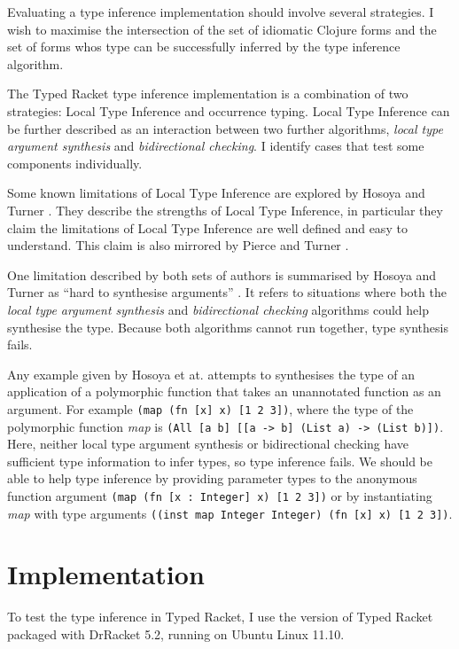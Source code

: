 \documentclass[12pt,a4paper]{article}
\begin{document}
Evaluating a type inference implementation should involve several
strategies. I wish to maximise the intersection of 
the set of idiomatic Clojure forms and the set of forms whos type
can be successfully inferred by the type inference algorithm.

The Typed Racket type inference implementation is a combination
of two strategies: Local Type Inference and occurrence typing. 
Local Type Inference can be further described as an interaction between
two further algorithms,
\emph{local type argument synthesis} and \emph{bidirectional checking}\cite{Hosoya99howgood}.
I identify cases that test some components individually.

Some known limitations of Local Type Inference are explored by
Hosoya and Turner \cite{Hosoya99howgood}. They describe the strengths
of Local Type Inference, in particular they claim the limitations of
Local Type Inference are well defined and easy to understand. This claim
is also mirrored by Pierce and Turner \cite{Pierce:2000:LTI:345099.345100}.

One limitation described by both sets of authors is summarised by
Hosoya and Turner as ``hard to synthesise arguments'' \cite{Hosoya99howgood}.
It refers to situations where both the \emph{local type argument synthesis} and
\emph{bidirectional checking} algorithms could help synthesise the type. Because
both algorithms cannot run together, type synthesis fails.

Any example given by Hosoya et at. \cite{Hosoya99howgood} attempts to synthesises the type of an application of a polymorphic
function that takes an unannotated function as an argument.
For example \lstinline|(map (fn [x] x) [1 2 3])|,
where the type of the polymorphic function \emph{map} is 
\lstinline|(All [a b] [[a -> b] (List a) -> (List b)])|. Here, neither 
local type argument synthesis or bidirectional checking have sufficient type information
to infer types, so type inference fails. We should be able to help type inference
by providing parameter types to the anonymous function argument \lstinline|(map (fn [x : Integer] x) [1 2 3])|
or by instantiating \emph{map} with type arguments \lstinline|((inst map Integer Integer) (fn [x] x) [1 2 3])|.

\section{Implementation}

To test the type inference in Typed Racket,
I use the version of Typed Racket packaged with DrRacket 5.2, running on Ubuntu Linux 11.10.
\end{document}
